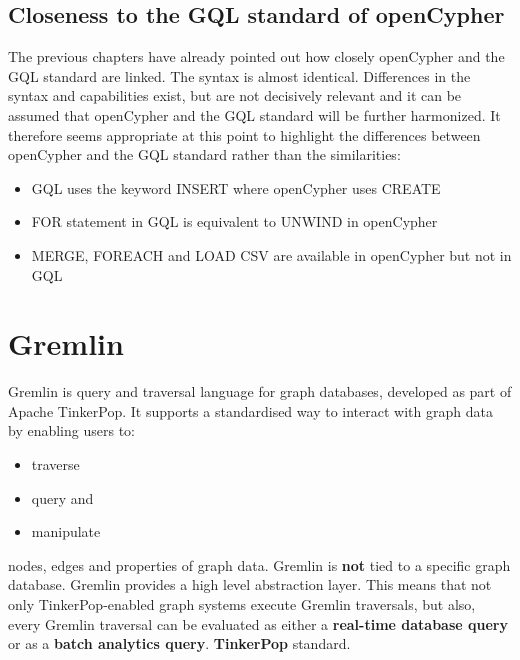 \subsection{Closeness to the GQL standard of openCypher}
\label{subsec:different_query_languages_for_graph_databases:openCypher:iso}
The previous chapters have already pointed out how closely openCypher 
and the GQL standard are linked. 
The syntax is almost identical. 
Differences in the syntax and capabilities exist, 
but are not decisively relevant and it can be assumed that openCypher 
and the GQL standard will be further harmonized. 
It therefore seems appropriate at this point to highlight the differences 
between openCypher and the GQL standard rather than the similarities:

\begin{itemize}
	\item GQL uses the keyword INSERT where openCypher uses CREATE
	\item FOR statement in GQL is equivalent to UNWIND in openCypher
	\item MERGE, FOREACH and LOAD CSV are available in openCypher but not in GQL
\end{itemize}


\section{Gremlin}
\label{sec:different_query_languages_for_graph_databases:gremlin}
Gremlin is query and traversal language for graph databases, developed as part of Apache TinkerPop.
It supports a standardised way to interact with graph data by enabling users to:
\begin{itemize}
	\item traverse
	\item query and
	\item manipulate
\end{itemize}
nodes, edges and properties of graph data. Gremlin is \textbf{not} tied to a specific graph database.
Gremlin provides a high level abstraction layer.
This means that not only TinkerPop-enabled graph systems execute Gremlin traversals, 
but also, every Gremlin traversal can be evaluated as either a \textbf{real-time database query}
or as a \textbf{batch analytics query}. 
\textbf{TinkerPop} standard.
